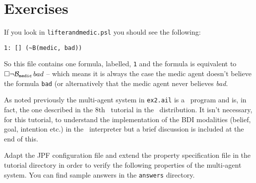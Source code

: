 \section{Exercises}
If you look in \texttt{lifterandmedic.psl} you should see the following:
\begin{verbatim}
1: [] (~B(medic, bad))
\end{verbatim}
So this file contains one formula, labelled, \texttt{1} and the formula is equivalent to $\Box \neg \mathrm{{\cal B}}_{\texttt{medic}} \, bad$\index{$\lbeliefop$} -- which means it is always the case the medic agent doesn't believe the formula \texttt{bad} (or alternatively that the medic agent never believes \emph{bad}.

As noted previously the multi-agent system in \texttt{ex2.ail} is a \gwendolen\ program and is, in fact, the one described in the 8th \gwendolen\ tutorial in the \mcapl\ distribution.  It isn't necessary, for this tutorial, to understand the implementation of the BDI modalities (belief, goal, intention etc.) in the \gwendolen\ interpreter but a brief discussion is included at the end of this.

Adapt the JPF configuration file and extend the property specification file in the tutorial directory in order to verify the following properties of the multi-agent system.  You can find sample answers in the \texttt{answers} directory.

